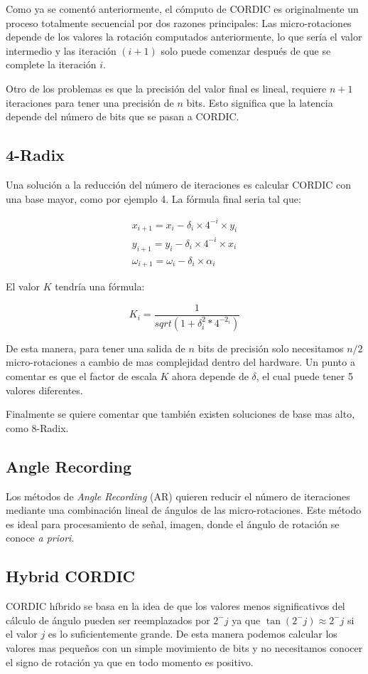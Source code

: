 Como ya se comentó anteriormente, el cómputo de CORDIC es originalmente un proceso totalmente secuencial por dos razones principales: Las micro-rotaciones depende de los valores la rotación computados anteriormente, lo que sería el valor intermedio y las iteración $(i+1)$ solo puede comenzar después de que se complete la iteración $i$.

Otro de los problemas es que la precisión del valor final es lineal, requiere $n+1$ iteraciones para tener una precisión de $n$ bits. Esto significa que la latencia depende del número de bits que se pasan a CORDIC.

\subsection{4-Radix}
Una solución a la reducción del número de iteraciones es calcular CORDIC con una base mayor, como por ejemplo 4. La fórmula final seria tal que:

\[
\begin{matrix}
x_{i+1} = x_{i} - \delta_{i} \times 4^{-i} \times y_{i} \\
y_{i+1} = y_{i} - \delta_{i} \times 4^{-i} \times x_{i} \\
\omega_{i+1} =  \omega_{i} - \delta_{i} \times \alpha_{i}
\end{matrix}
\]

El valor $K$ tendría una fórmula:

\[
K_{i} = \frac{1}{sqrt{(1+\delta_i^2*4^{-2_{i}})}}
\]

De esta manera, para tener una salida de $n$ bits de precisión solo necesitamos $n/2$ micro-rotaciones a cambio de mas complejidad dentro del hardware. Un punto a comentar es que el factor de escala $K$ ahora depende de $\delta$, el cual puede tener 5 valores diferentes.

Finalmente se quiere comentar que también existen soluciones de base mas alto, como 8-Radix.

\subsection{Angle Recording}
Los métodos de \textit{Angle Recording} (AR) quieren reducir el número de iteraciones mediante una combinación lineal de ángulos de las micro-rotaciones. Este método es ideal para procesamiento de señal, imagen, donde el ángulo de rotación se conoce \textit{a priori}.

\subsection{Hybrid CORDIC}
CORDIC híbrido se basa en la idea de que los valores menos significativos del cálculo de ángulo pueden ser reemplazados por $2^-j$ ya que $\tan(2^-j) \approx 2^-j $ si el valor $j$ es lo suficientemente grande. De esta manera podemos calcular los valores mas pequeños con un simple movimiento de bits y no necesitamos conocer el signo de rotación ya que en todo momento es positivo.

